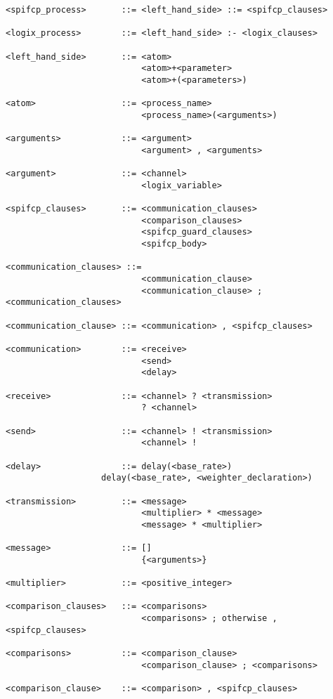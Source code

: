 \documentclass[twoside,10pt]{report}
\begin{document}
\begin{verbatim}
<spifcp_process>       ::= <left_hand_side> ::= <spifcp_clauses>

<logix_process>        ::= <left_hand_side> :- <logix_clauses>

<left_hand_side>       ::= <atom>
                           <atom>+<parameter>
                           <atom>+(<parameters>)

<atom>                 ::= <process_name>
                           <process_name>(<arguments>)

<arguments>            ::= <argument>
                           <argument> , <arguments>

<argument>             ::= <channel>
                           <logix_variable>

<spifcp_clauses>       ::= <communication_clauses>
                           <comparison_clauses>
                           <spifcp_guard_clauses>
                           <spifcp_body>

<communication_clauses> ::= 
                           <communication_clause> 
                           <communication_clause> ; <communication_clauses>

<communication_clause> ::= <communication> , <spifcp_clauses>

<communication>        ::= <receive>
                           <send>
                           <delay>

<receive>              ::= <channel> ? <transmission>
                           ? <channel>

<send>                 ::= <channel> ! <transmission>
                           <channel> !

<delay>                ::= delay(<base_rate>)
		           delay(<base_rate>, <weighter_declaration>)

<transmission>         ::= <message>
                           <multiplier> * <message>
                           <message> * <multiplier>

<message>              ::= []
                           {<arguments>}

<multiplier>           ::= <positive_integer>

<comparison_clauses>   ::= <comparisons>
                           <comparisons> ; otherwise , <spifcp_clauses>

<comparisons>          ::= <comparison_clause>
                           <comparison_clause> ; <comparisons>

<comparison_clause>    ::= <comparison> , <spifcp_clauses>


\end{verbatim}
\end{document}
